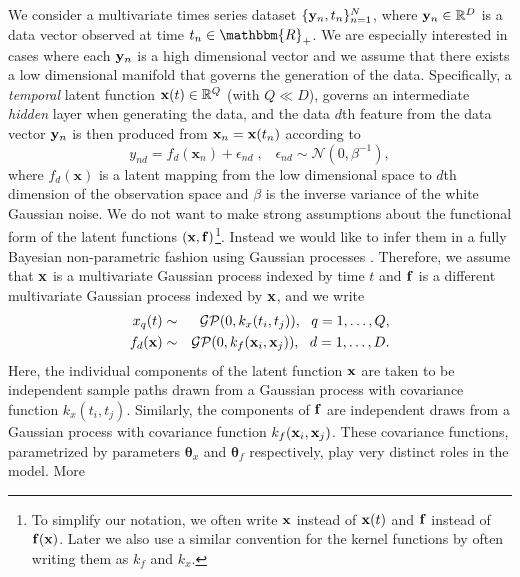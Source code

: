 \documentclass{article} %
\begin{document}
We consider a multivariate times series dataset
$\{\mathbf{y}_n,t_n\}_{n=1}^N$, where $\mathbf{y}_n \in \mathbb{R}^D$ is a data
vector observed at time $t_n \in \mathbbm{R}_+$. We are especially
interested in cases where each $\mathbf{y}_n$ is a high dimensional vector
and we assume that there exists a low dimensional manifold that
governs the generation of the data.  Specifically, a {\em temporal}
latent function $\mathbf{x}(t) \in \mathbb{R}^Q$ (with $Q \ll D$), governs
an intermediate {\em hidden} layer when generating the data, and the
data $d$th feature from the data vector $\mathbf{y}_n$ is then produced from
$\mathbf{x}_n = \mathbf{x}(t_n)$ according to
\begin{equation}
\label{generative}
\mathit{y_{nd}} = f_d(\mathbf{x}_n) + \epsilon_{nd} \;, \;\;\; \epsilon_{nd} \sim \mathcal{N}(0, \beta^{-1}),
\end{equation}
where %
$f_d(\mathbf{x})$ is a latent mapping from the low dimensional space
to $d$th dimension of the observation space and $\beta$ is the inverse
variance of the white Gaussian noise.  We do not want to make strong
assumptions about the functional form of the latent functions $(\mathbf{x},
\mathbf{f})$\footnote{To simplify our notation, we often write $\mathbf{x}$
  instead of $\mathbf{x}(t)$ and $\mathbf{f}$ instead of $\mathbf{f}(\mathbf{x})$. Later we
  also use a similar convention for the kernel functions by often
  writing them as $\mathit{k}_f$ and $\mathit{k}_x$.}. Instead we
would like to infer them in a fully Bayesian non-parametric fashion
using Gaussian processes \cite{rasmussen-williams}.  Therefore, we
assume that $\mathbf{x}$ is a multivariate Gaussian process indexed by time
$t$ and $\mathbf{f}$ is a different multivariate Gaussian process indexed by
$\mathbf{x}$, and we write
\begin{eqnarray}
x_q(t)  & \sim & \mathcal{GP}(0, k_x(t_i,t_j)), \ \ q=1,\ldots,Q, \\     
f_d(\bfx)  & \sim & \mathcal{GP}(0, k_f(\bfx_i,\bfx_j)), \ \ d=1,\ldots,D.
\label{eq:GPpriors}
\end{eqnarray}
Here, the individual components of the latent function $\mathbf{x}$ are
taken to be independent sample paths drawn from a Gaussian process
with covariance function $k_x(t_i,t_j)$. Similarly, the components of
$\mathbf{f}$ are independent draws from a Gaussian process with covariance
function $k_f(\mathbf{x}_i,\mathbf{x}_j)$.  These covariance functions,
parametrized by parameters $\boldsymbol \theta_x$ and $\boldsymbol
\theta_f$ respectively, play very distinct roles in the model. More
\end{document}
